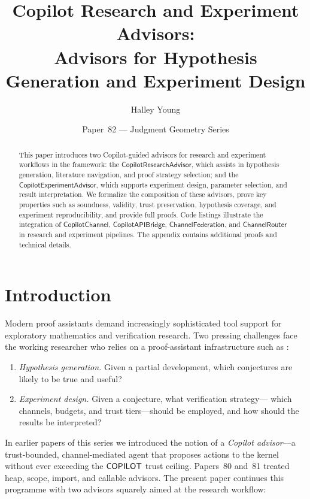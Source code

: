 \documentclass[11pt]{article}
\title{\textbf{Copilot Research and Experiment Advisors:\\ Advisors for Hypothesis Generation and Experiment Design}}
\author{Halley Young}
\date{Paper~82 --- Judgment Geometry Series}
\newcommand{\ResAdv}{\mathsf{CopilotResearchAdvisor}}
\newcommand{\ExpAdv}{\mathsf{CopilotExperimentAdvisor}}
\newcommand{\CopChan}{\mathsf{CopilotChannel}}
\newcommand{\CopBridge}{\mathsf{CopilotAPIBridge}}
\newcommand{\Route}{\mathsf{ChannelRouter}}
\newcommand{\Fed}{\mathsf{ChannelFederation}}
\begin{document}
\maketitle

\begin{abstract}
This paper introduces two Copilot-guided advisors for research and experiment workflows in the \JuGeo{} framework: the $\ResAdv$, which assists in hypothesis generation, literature navigation, and proof strategy selection; and the $\ExpAdv$, which supports experiment design, parameter selection, and result interpretation. We formalize the composition of these advisors, prove key properties such as soundness, validity, trust preservation, hypothesis coverage, and experiment reproducibility, and provide full proofs. Code listings illustrate the integration of $\CopChan$, $\CopBridge$, $\Fed$, and $\Route$ in research and experiment pipelines. The appendix contains additional proofs and technical details.
\end{abstract}

\section{Introduction}\label{sec:intro}

Modern proof assistants demand increasingly sophisticated tool support
for exploratory mathematics and verification research.
Two pressing challenges face the working researcher who relies
on a proof-assistant infrastructure such as \JuGeo{}:
\begin{enumerate}
\item \emph{Hypothesis generation.}  Given a partial development, which
      conjectures are likely to be true and useful?
\item \emph{Experiment design.}  Given a conjecture, what verification
      strategy---\ie{} which channels, budgets, and trust tiers---should
      be employed, and how should the results be interpreted?
\end{enumerate}

In earlier papers of this series we introduced the notion of a
\emph{Copilot advisor}---a trust-bounded, channel-mediated agent
that proposes actions to the kernel without ever exceeding the
$\mathsf{COPILOT}$ trust ceiling.  Papers~80 and~81 treated heap, scope,
import, and callable advisors.  The present paper continues this
programme with two advisors squarely aimed at the research workflow:
\end{document}
